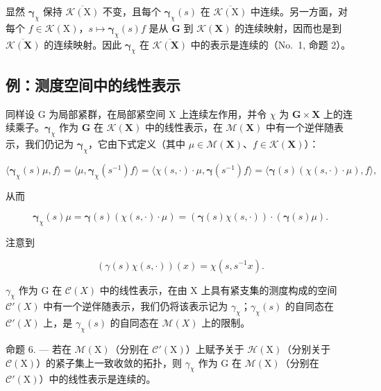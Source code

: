 显然 \(\pmb{\gamma}_{\chi}\) 保持 \(\overline{\mathcal{K}(\mathrm{X})}\) 不变，且每个 \(\pmb{\gamma}_{\chi}(s)\) 在 \(\overline{\mathcal{K}(\mathrm{X})}\) 中连续。另一方面，对每个 \(f \in \mathcal{K}(\mathrm{X})\)，\(s \mapsto \pmb{\gamma}_{\chi}(s)f\) 是从 \(\mathbf{G}\) 到 \(\mathcal{K}(\mathbf{X})\) 的连续映射，因而也是到 \(\overline{\mathcal{K}(\mathbf{X})}\) 的连续映射。因此 \(\pmb{\gamma}_{\chi}\) 在 \(\overline{\mathcal{K}(\mathbf{X})}\) 中的表示是连续的（No.~1, 命题 2）。

\subsection{例：测度空间中的线性表示}

同样设 G 为局部紧群，在局部紧空间 X 上连续左作用，并令 \(\chi\) 为 \(\mathbf{G} \times \mathbf{X}\) 上的连续乘子。\(\boldsymbol{\gamma}_{\chi}\) 作为 \(\mathbf{G}\) 在 \(\mathcal{K}(\mathbf{X})\) 中的线性表示，在 \(\mathcal{M}(\mathbf{X})\) 中有一个逆伴随表示，我们仍记为 \(\boldsymbol{\gamma}_{\chi}\)，它由下式定义（其中 \(\mu \in \mathcal{M}(\mathbf{X})\)、\(f \in \mathcal{K}(\mathbf{X})\)）：

\[
\langle \boldsymbol {\gamma} _ {\chi} (s) \mu , f \rangle = \langle \mu , \boldsymbol {\gamma} _ {\chi} (s ^ {- 1}) f \rangle = \langle \chi (s, \cdot) \cdot \mu , \boldsymbol {\gamma} (s ^ {- 1}) f \rangle = \langle \boldsymbol {\gamma} (s) (\chi (s, \cdot) \cdot \mu), f \rangle ,
\]

从而

\[
\boldsymbol {\gamma} _ {\chi} (s) \mu = \boldsymbol {\gamma} (s) (\chi (s, \cdot) \cdot \mu) = (\boldsymbol {\gamma} (s) \chi (s, \cdot)) \cdot (\boldsymbol {\gamma} (s) \mu).
\]

注意到

\[
\left(\gamma (s) \chi (s, \cdot)\right) (x) = \chi (s, s ^ {- 1} x).
\]

\(\gamma_{\chi}\) 作为 G 在 \(\mathcal{C}(X)\) 中的线性表示，在由 X 上具有紧支集的测度构成的空间 \(\mathcal{C}'(X)\) 中有一个逆伴随表示，我们仍将该表示记为 \(\gamma_{\chi}\)；\(\gamma_{\chi}(s)\) 的自同态在 \(\mathcal{C}'(X)\) 上，是 \(\gamma_{\chi}(s)\) 的自同态在 \(\mathcal{M}(X)\) 上的限制。

命题 6. --- 若在 \(\mathcal{M}(\mathrm{X})\)（分别在 \(\mathcal{C}'(\mathrm{X})\)）上赋予关于 \(\mathcal{H}(\mathrm{X})\)（分别关于 \(\mathcal{C}(\mathrm{X})\)）的紧子集上一致收敛的拓扑，则 \(\gamma_{\chi}\) 作为 \(\mathrm{G}\) 在 \(\mathcal{M}(\mathrm{X})\)（分别在 \(\mathcal{C}'(\mathrm{X})\)）中的线性表示是连续的。

